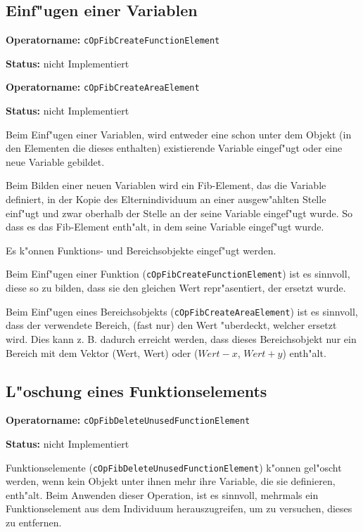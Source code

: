 \subsection{Einf"ugen einer Variablen}

\textbf{Operatorname:} \verb|cOpFibCreateFunctionElement|

\bigskip\noindent
\textbf{Status:} nicht Implementiert

\bigskip\noindent
\textbf{Operatorname:} \verb|cOpFibCreateAreaElement|

\bigskip\noindent
\textbf{Status:} nicht Implementiert

\bigskip\noindent
Beim Einf"ugen einer Variablen, wird entweder eine schon unter dem Objekt (in den Elementen die dieses enthalten) existierende Variable eingef"ugt oder eine neue Variable gebildet.

Beim Bilden einer neuen Variablen wird ein Fib-Element, das die Variable definiert, in der Kopie des Elternindividuum an einer ausgew"ahlten Stelle einf"ugt und zwar oberhalb der Stelle an der seine Variable eingef"ugt wurde. So dass es das Fib-Element enth"alt, in dem seine Variable eingef"ugt wurde.

\bigskip\noindent
Es k"onnen Funktions- und Bereichsobjekte eingef"ugt werden.

\bigskip\noindent
Beim Einf"ugen einer Funktion (\verb|cOpFibCreateFunctionElement|) ist es sinnvoll, diese so zu bilden, dass sie den gleichen Wert repr"asentiert, der ersetzt wurde.

Beim Einf"ugen eines Bereichsobjekts (\verb|cOpFibCreateAreaElement|) ist es sinnvoll, dass der verwendete Bereich, (fast nur) den Wert "uberdeckt, welcher ersetzt wird. Dies kann z. B. dadurch erreicht werden, dass dieses Bereichsobjekt nur ein Bereich mit dem Vektor (Wert, Wert) oder ($Wert - x$, $Wert + y$) enth"alt.


\subsection{L"oschung eines Funktionselements}

\textbf{Operatorname:} \verb|cOpFibDeleteUnusedFunctionElement|

\bigskip\noindent
\textbf{Status:} nicht Implementiert

\bigskip\noindent
Funktionselemente (\verb|cOpFibDeleteUnusedFunctionElement|) k"onnen gel"oscht werden, wenn kein Objekt unter ihnen mehr ihre Variable, die sie definieren, enth"alt. Beim Anwenden dieser Operation, ist es sinnvoll, mehrmals ein Funktionselement aus dem Individuum herauszugreifen, um zu versuchen, dieses zu entfernen.


